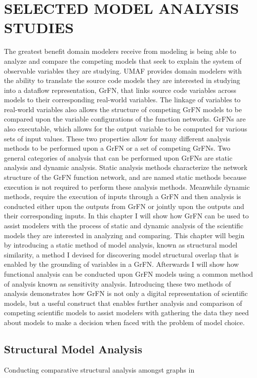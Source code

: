 \chapter{SELECTED MODEL ANALYSIS STUDIES\label{chapter:analysis_studies}}
The greatest benefit domain modelers receive from modeling is being able to analyze and compare the competing models that seek to explain the system of observable variables they are studying.
UMAF provides domain modelers with the ability to translate the source code models they are interested in studying into a dataflow representation, GrFN, that links source code variables across models to their corresponding real-world variables.
The linkage of variables to real-world variables also allows the structure of competing GrFN models to be compared upon the variable configurations of the function networks.
GrFNs are also executable, which allows for the output variable to be computed for various sets of input values.
These two properties allow for many different analysis methods to be performed upon a GrFN or a set of competing GrFNs.
Two general categories of analysis that can be performed upon GrFNs are static analysis and dynamic analysis.
Static analysis methods characterize the network structure of the GrFN function network, and are named static methods because execution is not required to perform these analysis methods.
Meanwhile dynamic methods, require the execution of inputs through a GrFN and then analysis is conducted either upon the outputs from GrFN or jointly upon the outputs and their corresponding inputs.
In this chapter I will show how GrFN can be used to assist modelers with the process of static and dynamic analysis of the scientific models they are interested in analyzing and comparing.
This chapter will begin by introducing a static method of model analysis, known as structural model similarity, a method I devised for discovering model structural overlap that is enabled by the grounding of variables in a GrFN.
Afterwards I will show how functional analysis can be conducted upon GrFN models using a common method of analysis known as sensitivity analysis.
Introducing these two methods of analysis demonstrates how GrFN is not only a digital representation of scientific models, but a useful construct that enables further analysis and comparison of competing scientific models to assist modelers with gathering the data they need about models to make a decision when faced with the problem of model choice.

\section{Structural Model Analysis\label{sec:structural_analysis}}
Conducting comparative structural analysis amongst graphs in

